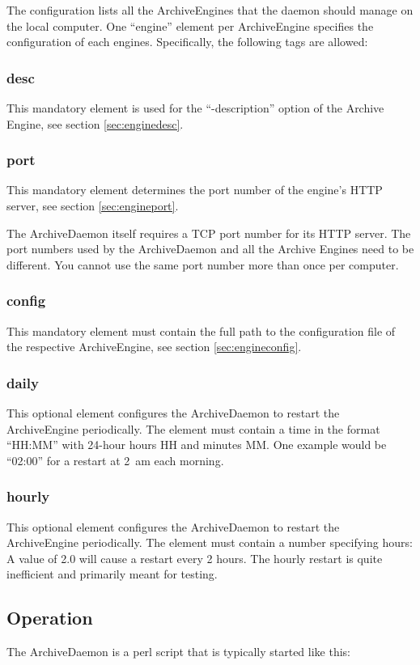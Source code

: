 \noindent The configuration lists all the
ArchiveEngines that the daemon should manage on the local
computer. One ``engine'' element per ArchiveEngine specifies the
configuration of each engines. Specifically, the following tags are
allowed:

\subsubsection{desc}
This mandatory element is used for the ``-description'' option of the
Archive Engine, see section \ref{sec:enginedesc}.

\subsubsection{port}
This mandatory element determines the port number of the engine's HTTP
server, see section \ref{sec:engineport}.

\NOTE The ArchiveDaemon itself requires a TCP port number for its HTTP
server. The port numbers used by the ArchiveDaemon and all the Archive
Engines need to be different. You cannot use the same port number more
than once per computer.

\subsubsection{config}
This mandatory element must contain the full path to the configuration
file of the respective ArchiveEngine, see section \ref{sec:engineconfig}.

\subsubsection{daily}
This optional element configures the ArchiveDaemon to restart the
ArchiveEngine periodically. The element must contain a time in the
format ``HH:MM'' with 24-hour hours HH and minutes MM. One example
would be ``02:00'' for a restart at 2~am each morning.

\subsubsection{hourly}
This optional element configures the ArchiveDaemon to restart the
ArchiveEngine periodically. The element must contain a number
specifying hours: A value of 2.0 will cause a restart every 2
hours. The hourly restart is quite inefficient and primarily meant for testing.

\subsection{Operation}
The ArchiveDaemon is a perl script that is typically started like this:

